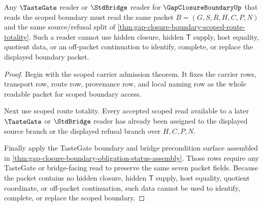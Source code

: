 \begin{theorem}
\label{thm:gap-closure-boundary-scoped-tastegate-readback}
Any $\TasteGate$ reader or $\StdBridge$ reader for $\GapClosureBoundaryUp$ that reads the scoped boundary must read the same packet $B=(G,S,R,H,C,P,N)$ and the same source/refusal split of \autoref{thm:gap-closure-boundary-scoped-route-totality}. Such a reader cannot use hidden closure, hidden $\mathsf{T}$ supply, host equality, quotient data, or an off-packet continuation to identify, complete, or replace the displayed boundary packet.
\end{theorem}
\begin{proof}
Begin with the scoped carrier admission theorem. It fixes the carrier rows, transport row, route row, provenance row, and local naming row as the whole readable packet for scoped boundary access.

Next use scoped route totality. Every accepted scoped read available to a later $\TasteGate$ or $\StdBridge$ reader has already been assigned to the displayed source branch or the displayed refusal branch over $H,C,P,N$.

Finally apply the TasteGate boundary and bridge precondition surface assembled in \autoref{thm:gap-closure-boundary-obligation-status-assembly}. Those rows require any TasteGate or bridge-facing read to preserve the same seven packet fields. Because the packet contains no hidden closure, hidden $\mathsf{T}$ supply, host equality, quotient coordinate, or off-packet continuation, such data cannot be used to identify, complete, or replace the scoped boundary.
\end{proof}
